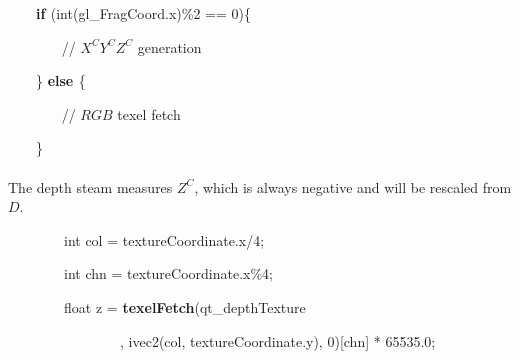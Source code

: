 {\ttfamily
\textcolor[rgb]{0.7529412,0.7529412,0.7529412}{\ \ \ \ }\textbf{\textcolor[rgb]{0.5019608,0.5019608,0.0}{if } }\textcolor[rgb]{0.7529412,0.7529412,0.7529412}{
}(\textcolor[rgb]{0.5019608,0.5019608,0.0}{int}(\textcolor[rgb]{0.5019608,0.0,0.5019608}{gl\_FragCoord}.x)\%\textcolor[rgb]{0.0,0.0,0.5019608}{2 }\textcolor[rgb]{0.7529412,0.7529412,0.7529412}{
}==\textcolor[rgb]{0.7529412,0.7529412,0.7529412}{
 }\textcolor[rgb]{0.0,0.0,0.5019608}{0})\{}

{\ttfamily
\textcolor[rgb]{0.7529412,0.7529412,0.7529412}{\ \ \ \ \ \ \ }
\textcolor[rgb]{0.0,0.5019608,0.0}{// \(X^CY^CZ^C\) generation}
}

{\ttfamily
\textcolor[rgb]{0.7529412,0.7529412,0.7529412}{\ \ \ \ }\}\textcolor[rgb]{0.7529412,0.7529412,0.7529412}{
}\textbf{\textcolor[rgb]{0.5019608,0.5019608,0.0}{else }}\textcolor[rgb]{0.7529412,0.7529412,0.7529412}{
}\{}

{\ttfamily
\textcolor[rgb]{0.7529412,0.7529412,0.7529412}{\ \ \ \ \ \ \ }
\textcolor[rgb]{0.0,0.5019608,0.0}{// \(RGB\) texel fetch}
}

{\ttfamily
\textcolor[rgb]{0.7529412,0.7529412,0.7529412}{\ \ \ \ }\}}
%
\\\\\noindent
The depth steam measures \(Z^C\), which is always negative and will be rescaled from \(D\).

{\ttfamily
\textcolor[rgb]{0.7529412,0.7529412,0.7529412}{\ \ \ \ \ \ \ \  }\textcolor[rgb]{0.5019608,0.5019608,0.0}{int }\textcolor[rgb]{0.7529412,0.7529412,0.7529412}{
}col\textcolor[rgb]{0.7529412,0.7529412,0.7529412}{
}=\textcolor[rgb]{0.7529412,0.7529412,0.7529412}{
}textureCoordinate.x/\textcolor[rgb]{0.0,0.0,0.5019608}{4};}

{\ttfamily
\textcolor[rgb]{0.7529412,0.7529412,0.7529412}{\ \ \ \ \ \ \ \  }\textcolor[rgb]{0.5019608,0.5019608,0.0}{int }\textcolor[rgb]{0.7529412,0.7529412,0.7529412}{
}chn\textcolor[rgb]{0.7529412,0.7529412,0.7529412}{
}=\textcolor[rgb]{0.7529412,0.7529412,0.7529412}{
}textureCoordinate.x\%\textcolor[rgb]{0.0,0.0,0.5019608}{4};}

{\ttfamily
\textcolor[rgb]{0.7529412,0.7529412,0.7529412}{\ \ \ \ \ \ \ \  }\textcolor[rgb]{0.5019608,0.5019608,0.0}{float }\textcolor[rgb]{0.7529412,0.7529412,0.7529412}{
}z\textcolor[rgb]{0.7529412,0.7529412,0.7529412}{
}=\textcolor[rgb]{0.7529412,0.7529412,0.7529412}{
}\textbf{\textcolor[rgb]{0.5019608,0.5019608,0.0}{texelFetch}}(qt\_depthTexture}

{\ttfamily
\ \ \ \ \ \ 
\ \ \ \ \ \ \ \ \ \ ,\textcolor[rgb]{0.7529412,0.7529412,0.7529412}{
 }\textcolor[rgb]{0.5019608,0.5019608,0.0}{ivec2}(col,\textcolor[rgb]{0.7529412,0.7529412,0.7529412}{
}textureCoordinate.y),\textcolor[rgb]{0.7529412,0.7529412,0.7529412}{
 }\textcolor[rgb]{0.0,0.0,0.5019608}{0})[chn]\textcolor[rgb]{0.7529412,0.7529412,0.7529412}{
}*\textcolor[rgb]{0.7529412,0.7529412,0.7529412}{
 }\textcolor[rgb]{0.0,0.0,0.5019608}{65535.0};}

